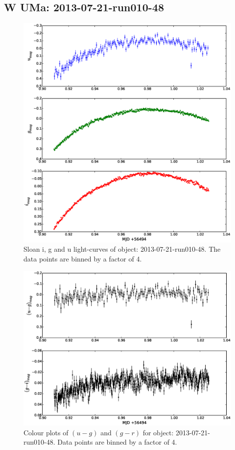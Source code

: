 \subsection{{W UMa}: 2013-07-21-run010-48}

\begin{figure}
  \includegraphics[width=120mm]{images/2013-07-21-run010-48_lightcurve-bin4.eps} 
  \caption{Sloan i, g and u light-curves of object: 2013-07-21-run010-48. The data points are binned by a factor of 4.}
  \label{fig:2013-07-21-run010-48}
\end{figure}

\begin{figure}
  \center
  \includegraphics[width=120mm]{images/2013-07-21-run010-48_colourcurve-bin4.eps}
  \caption{Colour plots of $(u-g)$ and $(g-r)$ for object: 2013-07-21-run010-48. Data points are binned by a factor of 4.}
  \label{fig:2013-07-21-run010-48-colour}
\end{figure}


